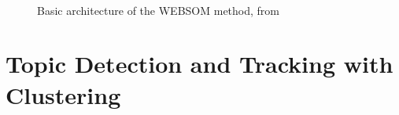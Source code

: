 \begin{figure}[htpb]
  \\
  \caption{Basic architecture of the WEBSOM method, from~\cite{honkelawebsom}}
  \label{fig:websom}
\end{figure}


 
\section{Topic Detection and Tracking with Clustering} 
\label{sec:topic_detection_on_twitter}

